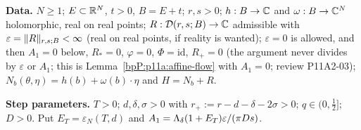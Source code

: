 \begin{proposition}\label{bpP:p11a:canonical-step}
\textbf{Data.} $N\ge1$; $E\subset\mathbb{R}^N$, $t>0$, $B=E+t$; $r,s>0$; $h:B\to\mathbb{C}$ and $\omega:B\to\mathbb{C}^N$ holomorphic, real on real points; $R:\mathcal D(r,s;B)\to\mathbb{C}$ admissible with $\varepsilon=\lVert R\rVert_{r,s;B}<\infty$ (real on real points, if reality is wanted); $\varepsilon=0$ is allowed, and then $A_1=0$ below, $R_*=0$, $\varphi=0$, $\Phi=\mathrm{id}$, $R_+=0$ (the argument never divides by $\varepsilon$ or $A_1$; this is Lemma~\ref{bpP:p11a:affine-flow} with $A_1=0$; review P11A2-03); $N_b(\theta,\eta)=h(b)+\omega(b)\cdot\eta$ and $H=N_b+R$.

\textbf{Step parameters.} $T>0$; $d,\delta,\sigma>0$ with $r_+:=r-d-\delta-2\sigma>0$; $q\in(0,\frac12]$; $D>0$. Put $E_T=\varepsilon_N(T,d)$ and $A_1=\Lambda_{\delta}(1+E_T)\varepsilon/(\pi Ds)$.


\end{proposition}
